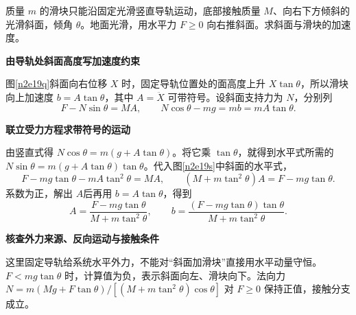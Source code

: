 \begin{question}\begin{example}[竖直导向块与水平斜面]\label{n2e19}
质量 $m$ 的滑块只能沿固定光滑竖直导轨运动，底部接触质量 $M$、向右下方倾斜的光滑斜面，倾角 $\theta$。地面光滑，用水平力 $F\ge0$ 向右推斜面。求斜面与滑块的加速度。
\end{example}\end{question}
\begin{solution}\textbf{由导轨处斜面高度写加速度约束}\par\nobreak
图\ref{n2e19q}斜面向右位移 $X$ 时，固定导轨位置处的面高度上升 $X\tan\theta$，所以滑块向上加速度 $b=A\tan\theta$，其中 $A=\ddot X$ 可带符号。设斜面支持力为 $N$，分别列
\[F-N\sin\theta=MA,\qquad N\cos\theta-mg=mb=mA\tan\theta.\]


\par\medskip{}\noindent\textbf{联立受力方程求带符号的运动}\par\nobreak
由竖直式得 $N\cos\theta=m(g+A\tan\theta)$。将它乘 $\tan\theta$，就得到水平式所需的 $N\sin\theta=m(g+A\tan\theta)\tan\theta$。代入图\ref{n2e19s}中斜面的水平式，
\[
 F-mg\tan\theta-mA\tan^2\theta=MA,
 \qquad (M+m\tan^2\theta)A=F-mg\tan\theta.
\]
系数为正，解出 $A$后再用 $b=A\tan\theta$，得到
\[
 A=\frac{F-mg\tan\theta}{M+m\tan^2\theta},\qquad
 b=\frac{(F-mg\tan\theta)\tan\theta}{M+m\tan^2\theta}.
\]


\par\medskip{}\noindent\textbf{核查外力来源、反向运动与接触条件}\par\nobreak
这里固定导轨给系统水平外力，不能对“斜面加滑块”直接用水平动量守恒。$F<mg\tan\theta$ 时，计算值为负，表示斜面向左、滑块向下。法向力 $N=m(Mg+F\tan\theta)/[(M+m\tan^2\theta)\cos\theta]$ 对 $F\ge0$ 保持正值，接触分支成立。
\end{solution}

